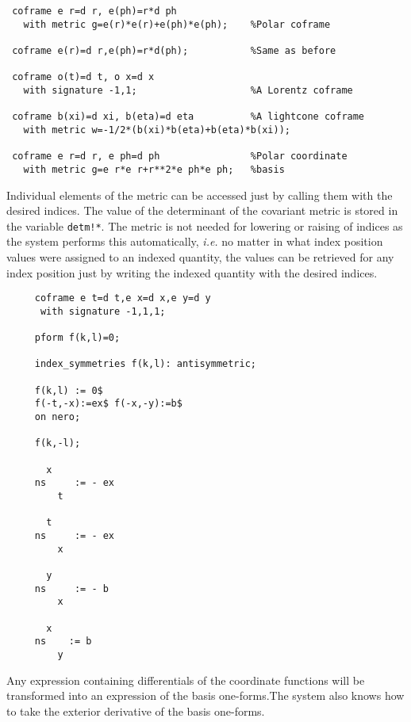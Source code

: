 \example{}

\begin{verbatim}
 coframe e r=d r, e(ph)=r*d ph
   with metric g=e(r)*e(r)+e(ph)*e(ph);    %Polar coframe

 coframe e(r)=d r,e(ph)=r*d(ph);           %Same as before

 coframe o(t)=d t, o x=d x
   with signature -1,1;                    %A Lorentz coframe

 coframe b(xi)=d xi, b(eta)=d eta          %A lightcone coframe
   with metric w=-1/2*(b(xi)*b(eta)+b(eta)*b(xi));

 coframe e r=d r, e ph=d ph                %Polar coordinate
   with metric g=e r*e r+r**2*e ph*e ph;   %basis

\end{verbatim}

Individual elements of the metric can be accessed just by calling them
with the desired indices. The value of the determinant of the
 
covariant metric is stored in the variable \texttt{detm!*}.  The metric
is not needed for lowering or raising of indices as the system
performs this automatically, \emph{i.e.} no matter in what index
position values were assigned to an indexed quantity, the values can
be retrieved for any index position just by writing the indexed
quantity with the desired indices.

\example{}

\begin{verbatim}
     coframe e t=d t,e x=d x,e y=d y
      with signature -1,1,1;

     pform f(k,l)=0;

     index_symmetries f(k,l): antisymmetric;

     f(k,l) := 0$
     f(-t,-x):=ex$ f(-x,-y):=b$
     on nero;

     f(k,-l);

       x
     ns     := - ex
         t

       t
     ns     := - ex
         x

       y
     ns     := - b
         x

       x
     ns    := b
         y
\end{verbatim}

Any expression containing differentials of the coordinate functions will
be transformed into an expression of the basis one-forms.The system also
knows how to take the exterior derivative of the basis one-forms.

